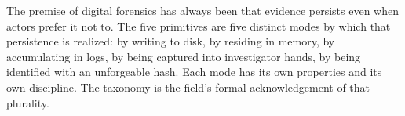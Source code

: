 The premise of digital forensics has always been that evidence persists
even when actors prefer it not to. The five primitives are five distinct
modes by which that persistence is realized: by writing to disk, by
residing in memory, by accumulating in logs, by being captured into
investigator hands, by being identified with an unforgeable hash. Each
mode has its own properties and its own discipline. The taxonomy is the
field's formal acknowledgement of that plurality.
